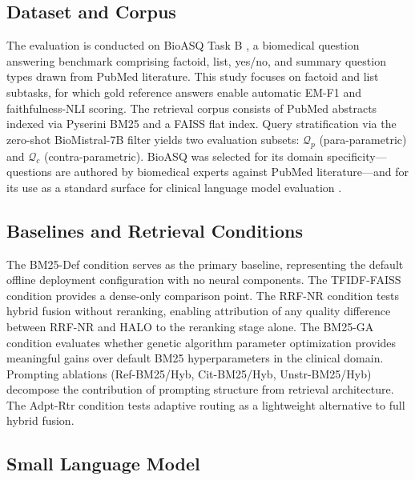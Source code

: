 \documentclass{article}
\begin{document}
\label{sec:experiments}

\subsection{Dataset and Corpus}

\label{sec:dataset_and_corpus}

The evaluation is conducted on BioASQ Task B \cite{tsatsaronis2015overview}, a biomedical question answering benchmark comprising factoid, list, yes/no, and summary question types drawn from PubMed literature. This study focuses on factoid and list subtasks, for which gold reference answers enable automatic EM-F1 and faithfulness-NLI scoring. The retrieval corpus consists of PubMed abstracts indexed via Pyserini BM25 and a FAISS flat index. Query stratification via the zero-shot BioMistral-7B filter yields two evaluation subsets: $\mathcal{Q}_p$ (para-parametric) and $\mathcal{Q}_c$ (contra-parametric). BioASQ was selected for its domain specificity---questions are authored by biomedical experts against PubMed literature---and for its use as a standard surface for clinical language model evaluation \cite{singhal2023large}.

\subsection{Baselines and Retrieval Conditions}

\label{sec:baselines_and_retrieval_conditions}

The BM25-Def condition serves as the primary baseline, representing the default offline deployment configuration with no neural components. The TFIDF-FAISS condition provides a dense-only comparison point. The RRF-NR condition tests hybrid fusion without reranking, enabling attribution of any quality difference between RRF-NR and HALO to the reranking stage alone. The BM25-GA condition evaluates whether genetic algorithm parameter optimization \cite{katoch2020review} provides meaningful gains over default BM25 hyperparameters in the clinical domain. Prompting ablations (Ref-BM25/Hyb, Cit-BM25/Hyb, Unstr-BM25/Hyb) decompose the contribution of prompting structure from retrieval architecture. The Adpt-Rtr condition tests adaptive routing as a lightweight alternative to full hybrid fusion.

\subsection{Small Language Model}
\end{document}
